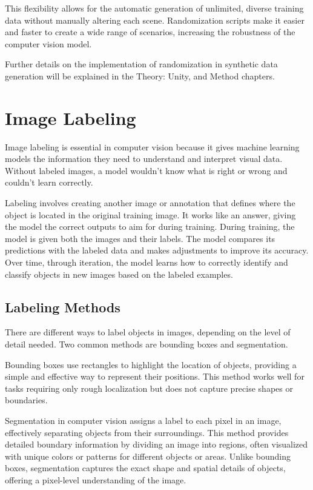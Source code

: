 This flexibility allows for the automatic generation of unlimited, diverse training data without manually altering each scene. Randomization scripts make it easier and faster to create a wide range of scenarios, increasing the robustness of the computer vision model.

Further details on the implementation of randomization in synthetic data generation will be explained in the Theory: Unity, and Method chapters.


\section{Image Labeling}

Image labeling is essential in computer vision because it gives machine learning models the information they need to understand and interpret visual data. Without labeled images, a model wouldn’t know what is right or wrong and couldn’t learn correctly. \cite{Labelling}

Labeling involves creating another image or annotation that defines where the object is located in the original training image. It works like an answer, giving the model the correct outputs to aim for during training. During training, the model is given both the images and their labels. The model compares its predictions with the labeled data and makes adjustments to improve its accuracy. Over time, through iteration, the model learns how to correctly identify and classify objects in new images based on the labeled examples. \cite{Labelling}

\subsection{Labeling Methods}

There are different ways to label objects in images, depending on the level of detail needed. Two common methods are bounding boxes and segmentation.

Bounding boxes use rectangles to highlight the location of objects, providing a simple and effective way to represent their positions. This method works well for tasks requiring only rough localization but does not capture precise shapes or boundaries.

Segmentation in computer vision assigns a label to each pixel in an image, effectively separating objects from their surroundings. This method provides detailed boundary information by dividing an image into regions, often visualized with unique colors or patterns for different objects or areas. Unlike bounding boxes, segmentation captures the exact shape and spatial details of objects, offering a pixel-level understanding of the image. \cite{labelingMethods}

